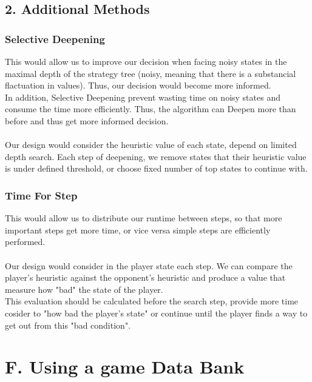 \documentclass{article}
\begin{document}
\subsection*{2. Additional Methods}
\subsubsection*{Selective Deepening}
This would allow us to improve our decision when facing noisy states in the maximal depth of the strategy tree (noisy, meaning that there is a substancial flactuation in values). Thus, our decision would become more informed. \\
In addition, Selective Deepening  prevent wasting time on noisy states and consume the time more efficiently. Thus, the algorithm can  Deepen more than before and thus get more informed decision.
\\~\\
Our design would consider the heuristic value of each state, depend on limited depth search. Each step of deepening, we remove states that their heuristic value is under defined threshold, or choose fixed number of top states to continue with.

\subsubsection*{Time For Step}
This would allow us to distribute our runtime between steps, so that more important steps get more time, or vice versa simple steps are efficiently performed. \\~\\
Our design would consider in the player state each step. We can compare the player's heuristic against the opponent's heuristic and produce a value that measure how "bad" the state of the player.\\
This evaluation should be calculated before the search step, provide more time cosider to "how bad the player's state" or continue until the player finds a way to get out from this "bad condition".

\section*{F. Using a game Data Bank}
\end{document}
